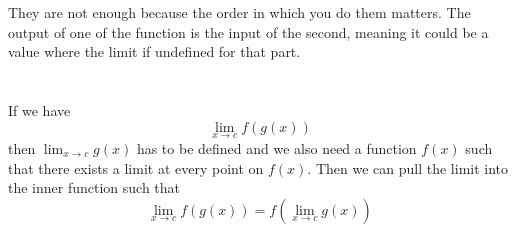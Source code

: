 \documentclass{article}
\begin{document}
\section{}
They are not enough because the order in which you do them matters. The output of one of the function is the input of the second, meaning it could be a value where the limit if undefined for that part. 

\section{}
If we have 
\[\lim_{x\to c} f (g(x))\]
then \(\lim_{x\to c} g(x)\) has to be defined and we also need a function \(f(x)\) such that there exists a limit at every point on \(f(x)\). Then we can pull the limit into the inner function such that 
\[\lim_{x\to c} f(g(x)) = f(\lim_{x\to c}g(x))\]
\end{document}
